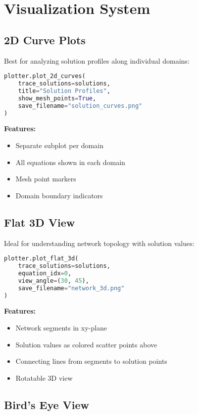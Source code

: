 \documentclass[11pt,a4paper]{article}
\begin{document}
\section{Visualization System}

\subsection{2D Curve Plots}

Best for analyzing solution profiles along individual domains:

\begin{lstlisting}[language=Python, caption={2D Curve Plotting}]
plotter.plot_2d_curves(
    trace_solutions=solutions,
    title="Solution Profiles",
    show_mesh_points=True,
    save_filename="solution_curves.png"
)
\end{lstlisting}

\textbf{Features:}
\begin{itemize}
    \item Separate subplot per domain
    \item All equations shown in each domain
    \item Mesh point markers
    \item Domain boundary indicators
\end{itemize}

\subsection{Flat 3D View}

Ideal for understanding network topology with solution values:

\begin{lstlisting}[language=Python, caption={Flat 3D Visualization}]
plotter.plot_flat_3d(
    trace_solutions=solutions,
    equation_idx=0,
    view_angle=(30, 45),
    save_filename="network_3d.png"
)
\end{lstlisting}

\textbf{Features:}
\begin{itemize}
    \item Network segments in xy-plane
    \item Solution values as colored scatter points above
    \item Connecting lines from segments to solution points
    \item Rotatable 3D view
\end{itemize}

\subsection{Bird's Eye View}
\end{document}

